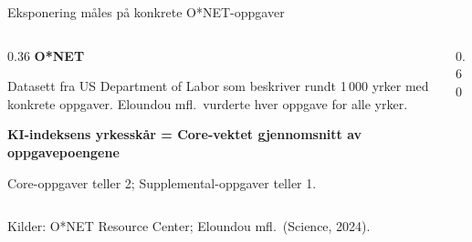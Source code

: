
\begin{frame}{Eksponering måles på konkrete O*NET-oppgaver}
\begin{columns}[T,onlytextwidth]
\begin{column}{0.36\textwidth}
  {\bfseries\textcolor{illBlue}{O*NET}}

  \vspace{0.5em}
  {\footnotesize\textcolor{illGray}{Datasett fra US Department of Labor som beskriver rundt 1\,000 yrker med konkrete oppgaver. Eloundou mfl.\ vurderte hver oppgave for alle yrker.}}

  \vspace{1.4em}
  {\small\bfseries\textcolor{illInk}{KI-indeksens yrkesskår = Core-vektet gjennomsnitt av oppgavepoengene}}

  \vspace{0.4em}
  {\footnotesize\textcolor{illGray}{Core-oppgaver teller 2; Supplemental-oppgaver teller 1.}}
\end{column}
\begin{column}{0.60\textwidth}
\end{column}
\end{columns}

\vspace{0.2em}
\raggedright\tiny\textcolor{illGray}{Kilder: O*NET Resource Center; Eloundou mfl.\ (Science, 2024).}
\end{frame}

